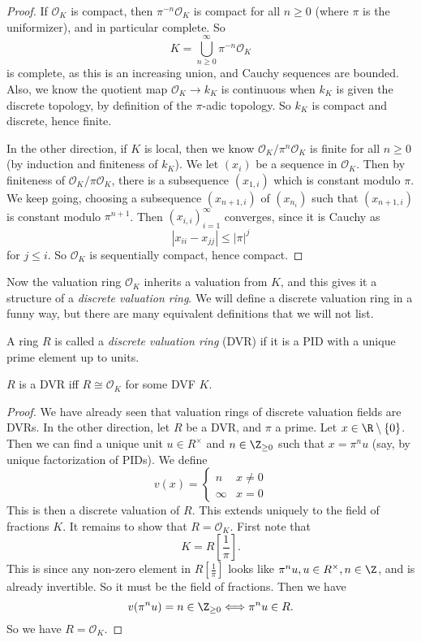 \documentclass[a4paper]{article}
\begin{document}
\begin{proof}
  If $\mathcal{O}_K$ is compact, then $\pi^{-n}\mathcal{O}_K$ is compact for all $n \geq 0$ (where $\pi$ is the uniformizer), and in particular complete. So
  \[
    K = \bigcup_{n \geq 0}^\infty \pi^{-n} \mathcal{O}_K
  \]
  is complete, as this is an increasing union, and Cauchy sequences are bounded. Also, we know the quotient map $\mathcal{O}_K \to k_K$ is continuous when $k_K$ is given the discrete topology, by definition of the $\pi$-adic topology. So $k_K$ is compact and discrete, hence finite.

  In the other direction, if $K$ is local, then we know $\mathcal{O}_K/\pi^n \mathcal{O}_K$ is finite for all $n \geq 0$ (by induction and finiteness of $k_K$). We let $(x_i)$ be a sequence in $\mathcal{O}_K$. Then by finiteness of $\mathcal{O}_K/\pi \mathcal{O}_K$, there is a subsequence $(x_{1, i})$ which is constant modulo $\pi$. We keep going, choosing a subsequence $(x_{n + 1, i})$ of $(x_{n_i})$ such that $(x_{n + 1, i})$ is constant modulo $\pi^{n + 1}$. Then $(x_{i, i})_{i = 1}^\infty$ converges, since it is Cauchy as
  \[
    |x_{ii} - x_{jj}| \leq |\pi|^j
  \]
  for $j \leq i$. So $\mathcal{O}_K$ is sequentially compact, hence compact.
\end{proof}

Now the valuation ring $\mathcal{O}_K$ inherits a valuation from $K$, and this gives it a structure of a \emph{discrete valuation ring}. We will define a discrete valuation ring in a funny way, but there are many equivalent definitions that we will not list.

\begin{defi}
  A ring $R$ is called a \emph{discrete valuation ring} (DVR) if it is a PID with a unique prime element up to units.
\end{defi}

\begin{prop}
  $R$ is a DVR iff $R \cong \mathcal{O}_K$ for some DVF $K$.
\end{prop}

\begin{proof}
  We have already seen that valuation rings of discrete valuation fields are DVRs. In the other direction, let $R$ be a DVR, and $\pi$ a prime. Let $x \in \R \setminus \{0\}$. Then we can find a unique unit $u \in R^\times$ and $n \in \Z_{\geq 0}$ such that $x = \pi^n u$ (say, by unique factorization of PIDs). We define
  \[
    v(x) =
    \begin{cases}
      n & x \not= 0\\
      \infty & x = 0
    \end{cases}
  \]
  This is then a discrete valuation of $R$. This extends uniquely to the field of fractions $K$. It remains to show that $R = \mathcal{O}_K$. First note that
  \[
    K = R\left[\frac{1}{\pi}\right].
  \]
  This is since any non-zero element in $R\left[\frac{1}{\pi}\right]$ looks like $\pi^n u, u \in R^\times, n \in \Z$, and is already invertible. So it must be the field of fractions. Then we have
  \[
    v(\pi^n u) = n \in \Z_{\geq 0} \Longleftrightarrow \pi^n u \in R.
  \]
  So we have $R = \mathcal{O}_K$.
\end{proof}
\end{document}
